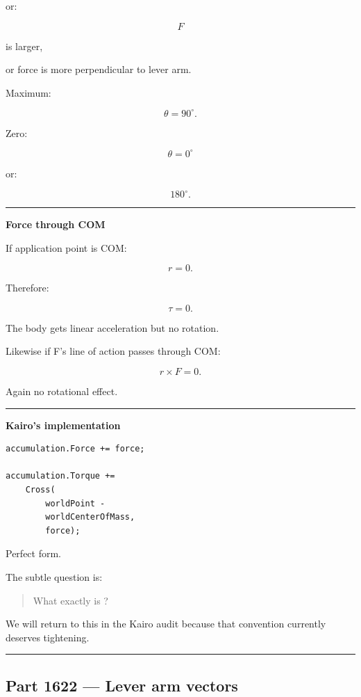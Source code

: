 or:

\[
F
\]

is larger,

or force is more perpendicular to lever arm.

Maximum:

\[
\theta=90^\circ.
\]

Zero:

\[
\theta=0^\circ
\]

or:

\[
180^\circ.
\]

\begin{center}\rule{0.5\linewidth}{0.5pt}\end{center}

\textbf{Force through COM}

If application point is COM:

\[
r=0.
\]

Therefore:

\[
\tau=0.
\]

The body gets linear acceleration but no rotation.

Likewise if F's line of action passes through COM:

\[
r\times F=0.
\]

Again no rotational effect.

\begin{center}\rule{0.5\linewidth}{0.5pt}\end{center}

\textbf{Kairo's implementation}

\begin{verbatim}
accumulation.Force += force;

accumulation.Torque +=
    Cross(
        worldPoint -
        worldCenterOfMass,
        force);
\end{verbatim}

Perfect form.

The subtle question is:

\begin{quote}
What exactly is ?
\end{quote}

We will return to this in the Kairo audit because that convention currently deserves tightening.

\begin{center}\rule{0.5\linewidth}{0.5pt}\end{center}

\subsection{Part 1622 --- Lever arm vectors}\label{06-engine-ii-ch035-part-1622-lever-arm-vectors}

